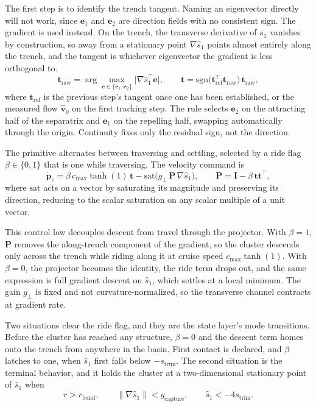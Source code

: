 \documentclass[lettersize,journal]{IEEEtran}
\begin{document}
The first step is to identify the trench tangent. Naming an eigenvector
directly will not work, since $\mathbf{e}_1$ and $\mathbf{e}_2$ are
direction fields with no consistent sign. The gradient is used instead. On the
trench, the transverse derivative of $s_1$ vanishes by construction, so
away from a stationary point $\nabla\hat{s}_1$ points almost entirely
along the trench, and the tangent is whichever eigenvector the gradient
is less orthogonal to.
\begin{equation}
    \mathbf{t}_{\mathrm{raw}} =
    \arg\max_{\mathbf{e} \in \{\mathbf{e}_1, \mathbf{e}_2\}}
    \bigl\lvert \nabla\hat{s}_1^\top \mathbf{e} \bigr\rvert,
    \qquad
    \mathbf{t} = \mathrm{sgn}\bigl(\mathbf{t}_{\mathrm{ref}}^\top
    \mathbf{t}_{\mathrm{raw}}\bigr)\,\mathbf{t}_{\mathrm{raw}},
    \label{eq:tangent_select}
\end{equation}
where $\mathbf{t}_{\mathrm{ref}}$ is the previous step's tangent once one
has been established, or the measured flow $\hat{\mathbf{v}}_0$ on the
first tracking step. The rule selects $\mathbf{e}_2$ on the attracting
half of the separatrix and $\mathbf{e}_1$ on the repelling half, swapping
automatically through the origin. Continuity fixes only the residual
sign, not the direction.

The primitive alternates between traversing and settling, selected by a
ride flag $\beta \in \{0,1\}$ that is one while traversing. The velocity
command is
\begin{equation}
    \dot{\mathbf{p}}_c =
    \beta\,c_{\max}\tanh(1)\,\mathbf{t}
    - \mathrm{sat}\!\bigl(g_\perp\,\mathbf{P}\,\nabla\hat{s}_1\bigr),
    \qquad
    \mathbf{P} = \mathbf{I} - \beta\,\mathbf{t}\mathbf{t}^\top,
\end{equation}
where $\mathrm{sat}$ acts on a vector by saturating its magnitude and
preserving its direction, reducing to the scalar saturation on any scalar
multiple of a unit vector.

This control law decouples descent from travel through the projector.
With $\beta = 1$, $\mathbf{P}$ removes the along-trench component of the
gradient, so the cluster descends only across the trench while riding
along it at cruise speed $c_{\max}\tanh(1)$. With $\beta = 0$, the
projector becomes the identity, the ride term drops out, and the same
expression is full gradient descent on $\hat{s}_1$, which settles at a
local minimum. The gain $g_\perp$ is fixed and not
curvature-normalized, so the transverse channel contracts at gradient
rate.

Two situations clear the ride flag, and they are the state layer's mode
transitions. Before the cluster has reached any structure, $\beta = 0$
and the descent term homes onto the trench from anywhere in the basin.
First contact is declared, and $\beta$ latches to one, when $\hat{s}_1$
first falls below $-s_{\mathrm{trim}}$. The second situation is the
terminal behavior, and it holds the cluster at a two-dimensional
stationary point of $\hat{s}_1$ when
\begin{equation}
    r > r_{\mathrm{band}}, \qquad
    \lVert\nabla\hat{s}_1\rVert < g_{\mathrm{capture}}, \qquad
    \hat{s}_1 < -4 s_{\mathrm{trim}}.
    \label{eq:capture_test}
\end{equation}
\end{document}
